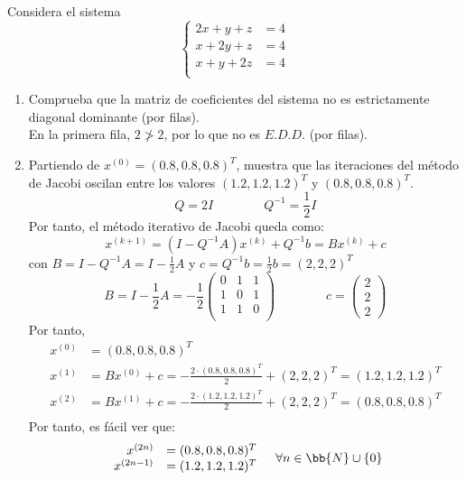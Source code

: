 \begin{ejercicio}
    Considera el sistema
    $$\left\{\begin{array}{cc}
        2x+y+z &=4  \\
        x+2y+z &=4  \\
        x+y+2z &=4  \\
    \end{array}\right.$$
    \begin{enumerate}
        \item Comprueba que la matriz de coeficientes del sistema no es estrictamente diagonal dominante (por filas).\\
        En la primera fila, $2\ngtr2$, por lo que no es $E.D.D.$ (por filas).

        \item Partiendo de $x^{(0)} = (0.8,0.8,0.8)^T$, muestra que las iteraciones del método de Jacobi oscilan entre los valores $(1.2,1.2,1.2)^T$ y $(0.8,0.8,0.8)^T$.\\
        $$Q=2I
        \qquad \qquad
        Q^{-1}=\frac{1}{2}I
        $$
        Por tanto, el método iterativo de Jacobi queda como:
        $$x^{(k+1)} = (I-Q^{-1}A)x^{(k)} + Q^{-1}b
        =Bx^{(k)} + c$$
        con $B=I-Q^{-1}A = I-\frac{1}{2}A$ y $c=Q^{-1}b = \frac{1}{2}b = (2,2,2)^T$
        $$B=I-\frac{1}{2}A = -\frac{1}{2}\left( \begin{array}{ccc}
            0 & 1 & 1 \\
            1 & 0 & 1 \\
            1 & 1 & 0 \\
        \end{array} \right)
        \qquad \qquad
        c=\left( \begin{array}{c}
            2 \\ 2 \\ 2
        \end{array} \right)$$
        Por tanto,
        \begin{equation*}
            \begin{split}
                x^{(0)} &= (0.8,0.8,0.8)^T \\
                x^{(1)} &= Bx^{(0)} + c = -\frac{2\cdot (0.8,0.8,0.8)^T}{2} +(2,2,2)^T =  (1.2,1.2,1.2)^T \\
                x^{(2)} &= Bx^{(1)} + c = -\frac{2\cdot (1.2,1.2,1.2)^T}{2} +(2,2,2)^T =  (0.8,0.8,0.8)^T \\
            \end{split}
        \end{equation*}
        Por tanto, es fácil ver que:
        \begin{equation*}
            \begin{array}{rl}
                x^{(2n)}&= (0.8,0.8,0.8)^T\\
                x^{(2n-1)}&= (1.2,1.2,1.2)^T \\
            \end{array} \quad \forall n \in \bb{N}\cup \{0\}
        \end{equation*}


\end{enumerate}
\end{ejercicio}
